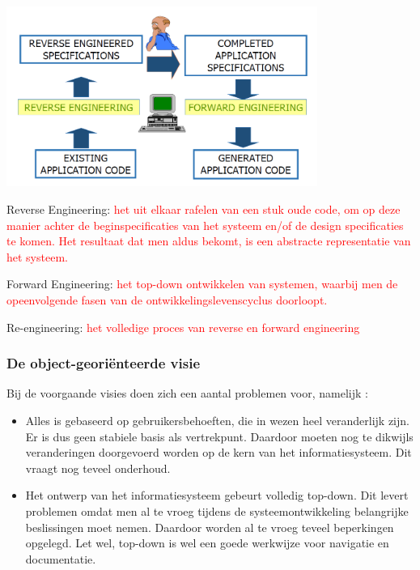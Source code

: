 
\begin{center}
\includegraphics[width=4in]{img/reverseengineering}%
\end{center}

Reverse Engineering:
\textcolor{red}{het uit elkaar rafelen van een stuk oude code, om op deze manier achter de beginspecificaties van het systeem en/of de design specificaties te komen. Het resultaat dat men aldus bekomt, is een abstracte representatie van het systeem.}

Forward Engineering: \textcolor{red}{het top-down ontwikkelen van systemen, waarbij men de opeenvolgende fasen van de ontwikkelingslevenscyclus doorloopt.}

Re-engineering: \textcolor{red}{het volledige proces van reverse en forward engineering}


\subsubsection{De object-georiënteerde visie}

Bij de voorgaande visies doen zich een aantal problemen voor, namelijk :

\begin{itemize}
    \item Alles is gebaseerd op gebruikersbehoeften, die in wezen heel veranderlijk zijn. Er is dus geen stabiele basis als vertrekpunt. Daardoor moeten nog te dikwijls veranderingen doorgevoerd worden op de kern van het informatiesysteem. Dit vraagt nog teveel onderhoud.
    \item Het ontwerp van het informatiesysteem gebeurt volledig top-down. Dit levert problemen omdat men al te vroeg tijdens de systeemontwikkeling belangrijke beslissingen moet nemen. Daardoor worden al te vroeg teveel beperkingen opgelegd. Let wel, top-down is wel een goede werkwijze voor navigatie en documentatie.
\end{itemize}


